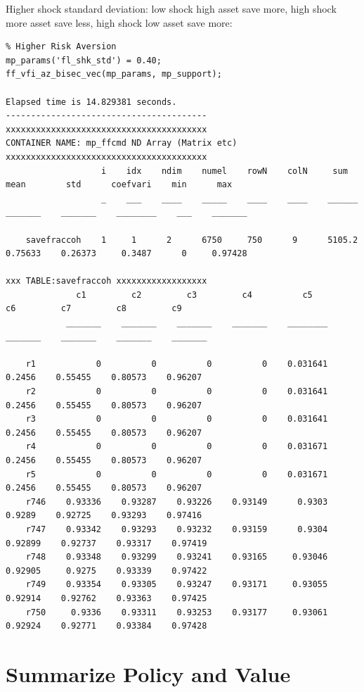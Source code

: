 \documentclass[
]{book}
\begin{document}
Higher shock standard deviation: low shock high asset save more, high
shock more asset save less, high shock low asset save more:

\begin{verbatim}
% Higher Risk Aversion
mp_params('fl_shk_std') = 0.40;
ff_vfi_az_bisec_vec(mp_params, mp_support);

Elapsed time is 14.829381 seconds.
----------------------------------------
xxxxxxxxxxxxxxxxxxxxxxxxxxxxxxxxxxxxxxxx
CONTAINER NAME: mp_ffcmd ND Array (Matrix etc)
xxxxxxxxxxxxxxxxxxxxxxxxxxxxxxxxxxxxxxxx
                   i    idx    ndim    numel    rowN    colN     sum       mean        std      coefvari    min      max  
                   _    ___    ____    _____    ____    ____    ______    _______    _______    ________    ___    _______

    savefraccoh    1     1      2      6750     750      9      5105.2    0.75633    0.26373     0.3487      0     0.97428

xxx TABLE:savefraccoh xxxxxxxxxxxxxxxxxx
              c1         c2         c3         c4          c5         c6         c7         c8         c9   
            _______    _______    _______    _______    ________    _______    _______    _______    _______

    r1            0          0          0          0    0.031641     0.2456    0.55455    0.80573    0.96207
    r2            0          0          0          0    0.031641     0.2456    0.55455    0.80573    0.96207
    r3            0          0          0          0    0.031641     0.2456    0.55455    0.80573    0.96207
    r4            0          0          0          0    0.031671     0.2456    0.55455    0.80573    0.96207
    r5            0          0          0          0    0.031671     0.2456    0.55455    0.80573    0.96207
    r746    0.93336    0.93287    0.93226    0.93149      0.9303     0.9289    0.92725    0.93293    0.97416
    r747    0.93342    0.93293    0.93232    0.93159      0.9304    0.92899    0.92737    0.93317    0.97419
    r748    0.93348    0.93299    0.93241    0.93165     0.93046    0.92905     0.9275    0.93339    0.97422
    r749    0.93354    0.93305    0.93247    0.93171     0.93055    0.92914    0.92762    0.93363    0.97425
    r750     0.9336    0.93311    0.93253    0.93177     0.93061    0.92924    0.92771    0.93384    0.97428
\end{verbatim}

\hypertarget{summarize-policy-and-value}{%
\chapter{Summarize Policy and Value}\label{summarize-policy-and-value}}
\end{document}
